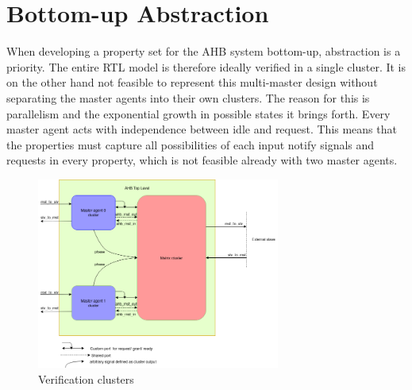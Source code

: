 \label{ch:design}

\section{Bottom-up Abstraction}
\label{sec:bottom-up}
When developing a property set for the AHB system bottom-up, abstraction is a priority. The entire RTL model is therefore ideally verified in a single cluster. 
It is on the other hand not feasible to represent this multi-master design without separating the master agents into their own clusters. The reason for this is 
parallelism and the exponential growth in possible states it brings forth. Every master agent acts with independence between idle and request. This means that the properties must capture all possibilities of each input notify signals and requests in every property, which is not feasible already with two master agents.
\begin{figure}
\includegraphics[width=8cm]{figs/Verif/Verif_block.png}
\caption{Verification clusters}\label{fig:verif-clust}
\end{figure} 


